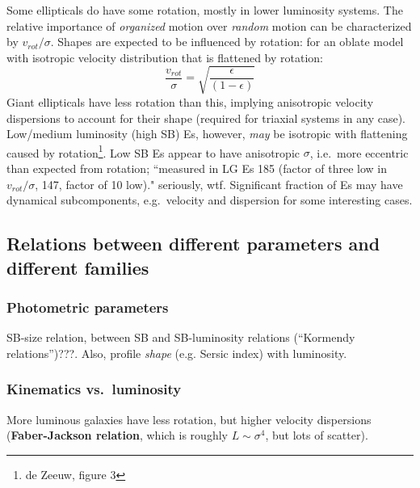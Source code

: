 \documentclass{article}
\newcommand{\mynotes}[1]{\textcolor{cadmiumorange}{#1}}
\begin{document}
Some ellipticals do have some rotation, mostly in lower luminosity systems.
The relative importance of \emph{organized} motion over \emph{random} motion
can be characterized by $v_{rot}/\sigma$.  Shapes are expected to be influenced
by rotation: for an oblate model with isotropic velocity distribution that is
flattened by rotation:
\[
    \frac{v_{rot}}{\sigma} = \sqrt{\frac{\epsilon}{\left(1-\epsilon\right)}}
\]
Giant ellipticals have less rotation than this, implying anisotropic velocity
dispersions to account for their shape (required for triaxial systems in any
case).  Low/medium luminosity (high SB) Es, however, \emph{may} be isotropic
with flattening caused by rotation\footnote{de Zeeuw, figure 3}.  Low SB Es
appear to have anisotropic $\sigma$, i.e.\ more eccentric than expected from
rotation; ``measured in LG Es 185 (factor of three low in $v_{rot}/\sigma$,
147, factor of 10 low)." \mynotes{seriously, wtf}.  Significant fraction of Es
may have dynamical subcomponents, e.g.\ velocity and dispersion for some
interesting cases.

\subsection{Relations between different parameters and different families}
\subsubsection{Photometric parameters}
SB-size relation, between SB and SB-luminosity relations
(``Kormendy relations'')\mynotes{???}.
Also, profile \emph{shape} (e.g. Sersic index) with luminosity.

\subsubsection{Kinematics vs.\ luminosity}
More luminous galaxies have less rotation, but higher velocity dispersions
(\textbf{Faber-Jackson relation}, which is roughly $L\sim\sigma^{4}$, but
lots of scatter).
\end{document}
